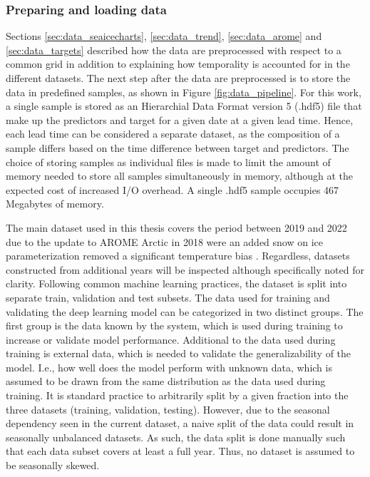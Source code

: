 \documentclass[../main/thesis]{subfiles}
\begin{document}
\subsubsection{Preparing and loading data}
\label{sec:dataloader}
Sections \ref{sec:data_seaicecharts}, \ref{sec:data_trend}, \ref{sec:data_arome} and \ref{sec:data_targets} described how the data are preprocessed with respect to a common grid in addition to explaining how temporality is accounted for in the different datasets. The next step after the data are preprocessed is to store the data in predefined samples, as shown in Figure \ref{fig:data_pipeline}. For this work, a single sample is stored as an Hierarchial Data Format version 5 (.hdf5) file that make up the predictors and target for a given date at a given lead time. Hence, each lead time can be considered a separate dataset, as the composition of a sample differs based on the time difference between target and predictors. The choice of storing samples as individual files is made to limit the amount of memory needed to store all samples simultaneously in memory, although at the expected cost of increased I/O overhead. A single .hdf5 sample occupies 467 Megabytes of memory.

The main dataset used in this thesis covers the period between 2019 and 2022 due to the update to AROME Arctic in 2018 were an added snow on ice parameterization removed a significant temperature bias \citep{Batrak2019}. Regardless, datasets constructed from additional years will be inspected although specifically noted for clarity. Following common machine learning practices, the dataset is split into separate train, validation and test subsets. The data used for training and validating the deep learning model can be categorized in two distinct groups. The first group is the data known by the system, which is used during training to increase or validate model performance. Additional to the data used during training is external data, which is needed to validate the generalizability of the model. I.e., how well does the model perform with unknown data, which is assumed to be drawn from the same distribution as the data used during training. It is standard practice to arbitrarily split by a given fraction into the three datasets (training, validation, testing). However, due to the seasonal dependency seen in the current dataset, a naive split of the data could result in seasonally unbalanced datasets. As such, the data split is done manually such that each data subset covers at least a full year. Thus, no dataset is assumed to be seasonally skewed.
\end{document}
